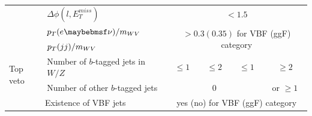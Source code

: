 \begin{table}[t]
\begin{center}
{\begin{tabular}{|l|l|c|c|c|c|}
				\cline{2-6}
				& $\Delta\phi(l,E^{miss}_{T})$ & \multicolumn{4}{c|}{ $<1.5$}\\
				\cline{2-6}
				& $\pt(e\nu) / m_{WV}$ &\multicolumn{4}{c|}{\multirow{2}{*}{$>0.3 (0.35)$ for VBF (ggF) category}}\\
				& $p_{T}(jj) / m_{WV}$ & \multicolumn{4}{c|}{ } \\
				\hline
				\multirow{2}{*}{Top veto} & Number of $b$-tagged jets in $W/Z$ & $\leq 1$ & $\leq 2$ & $\leq 1$ & $\geq2$ \\
				\cline{2-6}
				& Number of other $b$-tagged jets & \multicolumn{3}{c|}{0} & or $\geq 1$ \\
				\hline
				\multicolumn{2}{|c|}{Existence of VBF jets} & \multicolumn{4}{c|}{ yes (no) for VBF (ggF) category } \\
				\hline
			\end{tabular}
		}
	\end{center}
\end{table}

